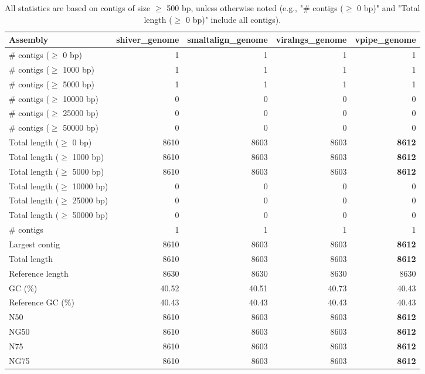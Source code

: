 \documentclass[12pt,a4paper]{article}
\begin{document}
\begin{table}[ht]
\begin{center}
\caption{All statistics are based on contigs of size $\geq$ 500 bp, unless otherwise noted (e.g., "\# contigs ($\geq$ 0 bp)" and "Total length ($\geq$ 0 bp)" include all contigs).}
\begin{tabular}{|l*{4}{|r}|}
\hline
Assembly & shiver\_genome & smaltalign\_genome & viralngs\_genome & vpipe\_genome \\ \hline
\# contigs ($\geq$ 0 bp) & 1 & 1 & 1 & 1 \\ \hline
\# contigs ($\geq$ 1000 bp) & 1 & 1 & 1 & 1 \\ \hline
\# contigs ($\geq$ 5000 bp) & 1 & 1 & 1 & 1 \\ \hline
\# contigs ($\geq$ 10000 bp) & 0 & 0 & 0 & 0 \\ \hline
\# contigs ($\geq$ 25000 bp) & 0 & 0 & 0 & 0 \\ \hline
\# contigs ($\geq$ 50000 bp) & 0 & 0 & 0 & 0 \\ \hline
Total length ($\geq$ 0 bp) & 8610 & 8603 & 8603 & {\bf 8612} \\ \hline
Total length ($\geq$ 1000 bp) & 8610 & 8603 & 8603 & {\bf 8612} \\ \hline
Total length ($\geq$ 5000 bp) & 8610 & 8603 & 8603 & {\bf 8612} \\ \hline
Total length ($\geq$ 10000 bp) & 0 & 0 & 0 & 0 \\ \hline
Total length ($\geq$ 25000 bp) & 0 & 0 & 0 & 0 \\ \hline
Total length ($\geq$ 50000 bp) & 0 & 0 & 0 & 0 \\ \hline
\# contigs & 1 & 1 & 1 & 1 \\ \hline
Largest contig & 8610 & 8603 & 8603 & {\bf 8612} \\ \hline
Total length & 8610 & 8603 & 8603 & {\bf 8612} \\ \hline
Reference length & 8630 & 8630 & 8630 & 8630 \\ \hline
GC (\%) & 40.52 & 40.51 & 40.73 & 40.43 \\ \hline
Reference GC (\%) & 40.43 & 40.43 & 40.43 & 40.43 \\ \hline
N50 & 8610 & 8603 & 8603 & {\bf 8612} \\ \hline
NG50 & 8610 & 8603 & 8603 & {\bf 8612} \\ \hline
N75 & 8610 & 8603 & 8603 & {\bf 8612} \\ \hline
NG75 & 8610 & 8603 & 8603 & {\bf 8612} \\ \hline

\end{tabular}
\end{center}
\end{table}
\end{document}
